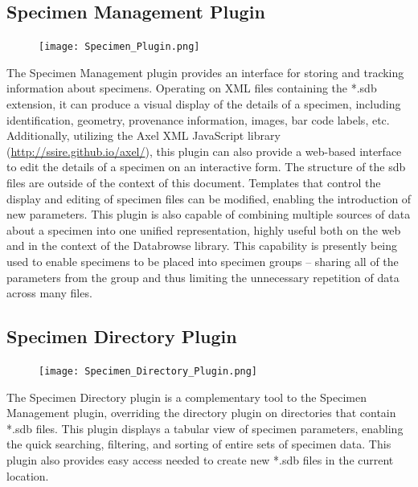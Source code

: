 \documentclass[10pt]{article}
\begin{document}
\clearpage
\begingroup
\setlength\intextsep{0pt}
\subsection{Specimen Management Plugin}
\begin{figure}
		\texttt{[image: Specimen\_Plugin.png]}
\end{figure}
The Specimen Management plugin provides an interface for storing and tracking information about specimens.  Operating on XML files containing the *.sdb extension, it can produce a visual display of the details of a specimen, including identification, geometry, provenance information, images, bar code labels, etc.  Additionally, utilizing the Axel XML JavaScript library (\url{http://ssire.github.io/axel/}), this plugin can also provide a web-based interface to edit the details of a specimen on an interactive form.  The structure of the sdb files are outside of the context of this document.  Templates that control the display and editing of specimen files can be modified, enabling the introduction of new parameters.  This plugin is also capable of combining multiple sources of data about a specimen into one unified representation, highly useful both on the web and in the context of the Databrowse library.  This capability is presently being used to enable specimens to be placed into specimen groups -- sharing all of the parameters from the group and thus limiting the unnecessary repetition of data across many files.

\endgroup



\begingroup
\setlength\intextsep{0pt}
\subsection{Specimen Directory Plugin}
\begin{figure}
		\texttt{[image: Specimen\_Directory\_Plugin.png]}
\end{figure}
The Specimen Directory plugin is a complementary tool to the Specimen Management plugin, overriding the directory plugin on directories that contain *.sdb files.  This plugin displays a tabular view of specimen parameters, enabling the quick searching, filtering, and sorting of entire sets of specimen data.  This plugin also provides easy access needed to create new *.sdb files in the current location.

\endgroup
\end{document}
